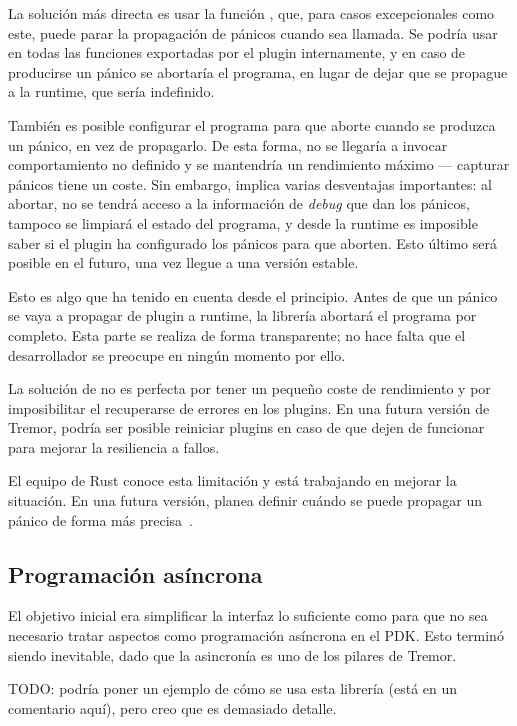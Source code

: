 La solución más directa es usar la función , que,
para casos excepcionales como este, puede parar la propagación de pánicos cuando
sea llamada. Se podría usar en todas las funciones exportadas por el plugin
internamente, y en caso de producirse un pánico se abortaría el programa, en
lugar de dejar que se propague a la runtime, que sería indefinido.

También es posible configurar el programa para que aborte cuando se produzca un
pánico, en vez de propagarlo. De esta forma, no se llegaría a invocar
comportamiento no definido y se mantendría un rendimiento máximo --- capturar
pánicos tiene un coste. Sin embargo, implica varias desventajas importantes: al
abortar, no se tendrá acceso a la información de \emph{debug} que dan los
pánicos, tampoco se limpiará el estado del programa, y desde la runtime es
imposible saber si el plugin ha configurado los pánicos para que aborten. Esto
último será posible en el futuro, una vez \textcite{pluggablepanic} llegue a una
versión estable.

Esto es algo que \abistable ha tenido en cuenta desde el principio. Antes de que
un pánico se vaya a propagar de plugin a runtime, la librería abortará el
programa por completo. Esta parte se realiza de forma transparente; no hace
falta que el desarrollador se preocupe en ningún momento por ello.

La solución de \abistable no es perfecta por tener un pequeño coste de
rendimiento y por imposibilitar el recuperarse de errores en los plugins. En una
futura versión de Tremor, podría ser posible reiniciar plugins en caso de que
dejen de funcionar para mejorar la resiliencia a fallos.

El equipo de Rust conoce esta limitación y está trabajando en mejorar la
situación. En una futura versión, planea definir cuándo se puede propagar un
pánico de forma más precisa~\cite{cunwind}.

\subsection{Programación asíncrona}

El objetivo inicial era simplificar la interfaz lo suficiente como para que no
sea necesario tratar aspectos como programación asíncrona en el PDK. Esto
terminó siendo inevitable, dado que la asincronía es uno de los pilares de
Tremor.

TODO: podría poner un ejemplo de cómo se usa esta librería (está en un
comentario aquí), pero creo que es demasiado detalle.

